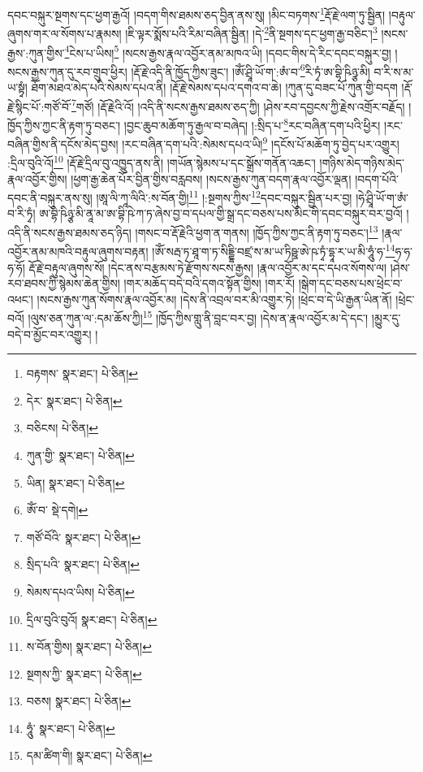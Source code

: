 དབང་བསྐུར་སྔགས་དང་ཕྱག་རྒྱའོ། །བདག་གིས་ཐམས་ཅད་བྱིན་ནས་སུ། །མིང་བཏགས་\footnote{བརྟགས་  སྣར་ཐང་།  པེ་ཅིན། }རྡོ་རྗེ་ལག་ཏུ་སྦྱིན། །བརྟུལ་ཞུགས་གར་ལ་སོགས་པ་རྣམས། །ཇི་ལྟར་སྨོས་པའི་རིམ་བཞིན་སྦྱིན། །དེ་\footnote{དེར་  སྣར་ཐང་།  པེ་ཅིན། }ནི་སྔགས་དང་ཕྱག་རྒྱ་བཅིང་།\footnote{བཅིངས།  པེ་ཅིན། } །སངས་རྒྱས་:ཀུན་གྱིས་\footnote{ཀུན་གྱི་  སྣར་ཐང་།  པེ་ཅིན། }ངེས་པ་ཡིས།\footnote{ཡིན།  སྣར་ཐང་།  པེ་ཅིན། } །སངས་རྒྱས་རྣལ་འབྱོར་ནམ་མཁའ་ཡི། །དབང་གིས་དེ་རིང་དབང་བསྐུར་བྱ། །སངས་རྒྱས་ཀུན་དུ་རབ་གྲུབ་ཕྱིར། །རྡོ་རྗེ་འདི་ནི་ཁྱོད་ཀྱིས་ཟུང་། །ཨོཾ་ཤྲཱི་ཡོ་ག་:ཨཾ་བ་\footnote{ཨོཾ་བ་  སྡེ་དགེ། }རི་ཏྭཾ་ཨ་བྷི་ཥིཉྩ་མི། བ་རི་ས་མ་ཡ་སྟྭཾ། ཐོག་མཐའ་མེད་པའི་སེམས་དཔའ་ནི། །རྡོ་རྗེ་སེམས་དཔའ་དགའ་བ་ཆེ། །ཀུན་དུ་བཟང་པོ་ཀུན་གྱི་བདག །རྡོ་རྗེ་སྙིང་པོ་:གཙོ་བོ་\footnote{གཙོ་བོའི་  སྣར་ཐང་།  པེ་ཅིན། }གཙོ། །རྡོ་རྗེའི་འོ། །འདི་ནི་སངས་རྒྱས་ཐམས་ཅད་ཀྱི། །ཤེས་རབ་དབྱངས་ཀྱི་རྗེས་འགྲོར་བརྗོད། །ཁྱོད་ཀྱིས་ཀྱང་ནི་རྟག་ཏུ་བཅང་། །བྱང་ཆུབ་མཆོག་ཏུ་རྒྱལ་བ་བཞེད། །:སྲིད་པ་\footnote{སྲིད་པའི་  སྣར་ཐང་།  པེ་ཅིན། }རང་བཞིན་དག་པའི་ཕྱིར། །རང་བཞིན་གྱིས་ནི་དངོས་མེད་བྱས། །རང་བཞིན་དག་པའི་:སེམས་དཔའ་ཡི།\footnote{སེམས་དཔའ་ཡིས།  པེ་ཅིན། } །དངོས་པོ་མཆོག་ཏུ་བྱེད་པར་འགྱུར། :དྲིལ་བུའི་འོ།\footnote{དྲིལ་བུའི་བུའོ།  སྣར་ཐང་།  པེ་ཅིན། } །རྡོ་རྗེ་དྲིལ་བུ་འཁྱུད་ནས་ནི། །གཡོན་སྙེམས་པ་དང་སྒྲོས་གནོན་འཆང་། །གཉིས་མེད་གཉིས་མེད་རྣལ་འབྱོར་གྱིས། །ཕྱག་རྒྱ་ཆེན་པོར་བྱིན་གྱིས་བརླབས། །སངས་རྒྱས་ཀུན་བདག་རྣལ་འབྱོར་ལྡན། །བདག་པོའི་དབང་ནི་བསྐུར་ནས་སུ། །ཨཱ་ལི་ཀཱ་ལིའི་:ས་བོན་གྱི།\footnote{ས་བོན་གྱིས།  སྣར་ཐང་།  པེ་ཅིན། } །:སྔགས་ཀྱིས་\footnote{སྔགས་ཀྱི་  སྣར་ཐང་།  པེ་ཅིན། }དབང་བསྐུར་སྦྱིན་པར་བྱ། །ཧེ་ཤྲཱི་ཡོ་ག་ཨཾ་བ་རི་ཏྭཾ། ཨ་བྷི་ཥིཉྩ་མི་ནཱ་མ་ཨ་བྷི་ཥེ་ཀ་ཏ་ཞེས་བྱ་བ་དཔལ་གྱི་སྒྲ་དང་བཅས་པས་མིང་གི་དབང་བསྐུར་བར་བྱའོ། །འདི་ནི་སངས་རྒྱས་ཐམས་ཅད་ཉིད། །གསང་བ་རྡོ་རྗེའི་ཕྱག་ན་གནས། །ཁྱོད་ཀྱིས་ཀྱང་ནི་རྟག་ཏུ་བཅང་།\footnote{བཅས།  སྣར་ཐང་།  པེ་ཅིན། } །རྣལ་འབྱོར་ནམ་མཁའི་བརྟུལ་ཞུགས་བརྟན། །ཨོཾ་སརྦ་ཏ་ཐཱ་ག་ཏ་སིདྡྷི་བཛྲ་ས་མ་ཡ་ཏིཥྛ་ཨེ་ཥ་ཏྭཾ་དྷཱ་ར་ཡ་མི་ཧཱུཾ་ཧ་\footnote{ཧཱུཾ་  སྣར་ཐང་།  པེ་ཅིན། }ཧ་ཧ་ཧ་ཧོ། རྡོ་རྗེ་བརྟུལ་ཞུགས་སོ། །དེང་ནས་བརྩམས་ཏེ་རྫོགས་སངས་རྒྱས། །རྣལ་འབྱོར་མ་དང་དཔའ་སོགས་ལ། །ཤེས་རབ་ཐབས་ཀྱི་སྙེམས་ཆེན་གྱིས། །གར་མཆོད་བདེ་བའི་དགའ་སྟོན་གྱིས། །གར་རོ། །སྒེག་དང་བཅས་པས་ཕྲེང་བ་འཕང་། །སངས་རྒྱས་ཀུན་སོགས་རྣལ་འབྱོར་མ། །དེས་ནི་འབྲལ་བར་མི་འགྱུར་ཏེ། །ཕྲེང་བ་དེ་ཡི་རྒྱན་ཡིན་ནོ། །ཕྲེང་བའོ། །ལུས་ཅན་ཀུན་ལ་:དམ་ཆོས་ཀྱི།\footnote{དམ་ཚིག་གི།  སྣར་ཐང་།  པེ་ཅིན། } །ཁྱོད་ཀྱིས་གླུ་ནི་བླང་བར་བྱ། །དེས་ན་རྣལ་འབྱོར་མ་དེ་དང་། །མྱུར་དུ་བདེ་བ་མྱོང་བར་འགྱུར། །

